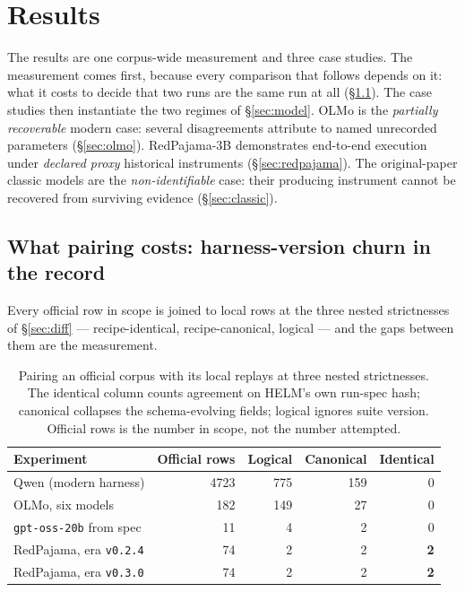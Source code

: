 \section{Results}
\label{sec:cases}

The results are one corpus-wide measurement and three case studies. The
measurement comes first, because every comparison that follows depends on it:
what it costs to decide that two runs are the same run at all
(\S\ref{sec:coverage}). The case studies then instantiate the two regimes of
\S\ref{sec:model}. OLMo is
the \emph{partially recoverable} modern case: several disagreements attribute to
named unrecorded parameters (\S\ref{sec:olmo}). RedPajama-3B demonstrates
end-to-end execution under \emph{declared proxy} historical instruments
(\S\ref{sec:redpajama}). The original-paper classic models are the
\emph{non-identifiable} case: their producing instrument cannot be recovered from
surviving evidence (\S\ref{sec:classic}).

\subsection{What pairing costs: harness-version churn in the record}
\label{sec:coverage}

Every official row in scope is joined to local rows at the three nested
strictnesses of \S\ref{sec:diff} --- recipe-identical, recipe-canonical, logical
--- and the gaps between them are the measurement.

\begin{table}[t]
\caption{Pairing an official corpus with its local replays at three nested
strictnesses. The identical column counts agreement on HELM's own run-spec hash;
canonical collapses the schema-evolving fields; logical ignores suite version.
Official rows is the number in scope, not the number attempted.}
\label{tab:coverage}
\begin{center}
\small
\begin{tabular}{lrrrr}
\toprule
\textbf{Experiment} & \textbf{Official rows} & \textbf{Logical} & \textbf{Canonical} & \textbf{Identical} \\
\midrule
Qwen (modern harness)          & 4723 & 775 & 159 & 0 \\
OLMo, six models               &  182 & 149 &  27 & 0 \\
\texttt{gpt-oss-20b} from spec &   11 &   4 &   2 & 0 \\
RedPajama, era \texttt{v0.2.4} &   74 &   2 &   2 & \textbf{2} \\
RedPajama, era \texttt{v0.3.0} &   74 &   2 &   2 & \textbf{2} \\
\bottomrule
\end{tabular}
\end{center}
\end{table}

